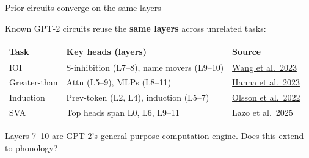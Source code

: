 \documentclass[10pt,aspectratio=169]{beamer}
\begin{document}
\begin{frame}
\begin{center}
\vfill
  {\setlength{\fboxrule}{2.5pt}}
\vfill
\end{center}
\end{frame}

\begin{frame}{Prior circuits converge on the same layers}
\hypertarget{sl:backbone}{}

Known GPT-2 circuits reuse the \textbf{same layers} across unrelated tasks:

\vspace{0.2em}
\begin{center}
\scriptsize
\renewcommand{\arraystretch}{1.1}
\begin{tabular}{lll}
\toprule
\textbf{Task} & \textbf{Key heads (layers)} & \textbf{Source} \\
\midrule
IOI & S-inhibition (L7--8), name movers (L9--10) & \href{https://arxiv.org/abs/2211.00593}{Wang et al.\ 2023} \\
Greater-than & Attn (L5--9), MLPs (L8--11) & \href{https://arxiv.org/abs/2305.00586}{Hanna et al.\ 2023} \\
Induction & Prev-token (L2, L4), induction (L5--7) & \href{https://arxiv.org/abs/2209.11895}{Olsson et al.\ 2022} \\
SVA & Top heads span L0, L6, L9--11 & \href{https://arxiv.org/abs/2506.22105}{Lazo et al.\ 2025} \\
\bottomrule
\end{tabular}
\end{center}

\vspace{0.3em}
\begin{center}
\end{center}

\vspace{0.4em}
Layers 7--10 are GPT-2's general-purpose computation engine. Does this extend to phonology?
\end{frame}
\end{document}
